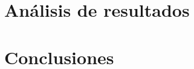\documentclass{article}
\begin{document}

\tableofcontents
\newpage


% 

% 

% 






\section{Análisis de resultados}

\section{Conclusiones}

% 
\end{document}
